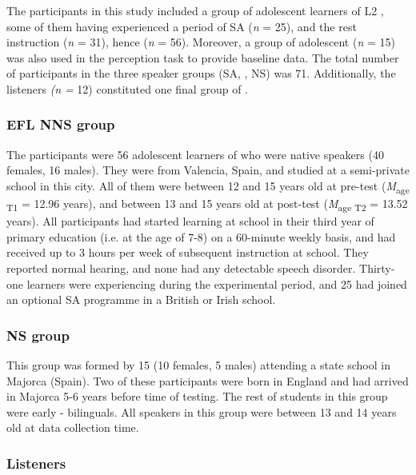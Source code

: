 \documentclass[output=paper]{langsci/langscibook}
\begin{document}
The participants in this study included a group of  adolescent learners of {L2} , some of them having experienced a period of SA (\textit{n} = 25), and the rest  instruction (\textit{n} = 31), hence  (\textit{n} = 56). Moreover, a group of adolescent   (\textit{n} = 15) was also used in the perception task to provide baseline data. The total number of participants in the three speaker groups (SA, , NS) was 71. Additionally, the listeners \textit{(n} \textit{=} 12) constituted one final group of .


\subsubsection{ EFL NNS group}

The  participants were 56 adolescent learners of  who were native  speakers (40 females, 16 males). They were from Valencia, Spain, and studied at a semi-private school in this city. All of them were between 12 and 15 years old at pre-test (\textit{M}\textsubscript{age T1} = 12.96 years), and between 13 and 15 years old at post-test (\textit{M}\textsubscript{age T2} = 13.52 years). All participants had started learning  at school in their third year of primary education (i.e. at the age of 7-8) on a 60-minute weekly basis, and had received up to 3 hours per week of subsequent  instruction at school. They reported normal hearing, and none had any detectable speech disorder. Thirty-one learners were experiencing  during the experimental period, and 25 had joined an optional SA programme in a British or Irish school.


\subsubsection{NS group}

This group was formed by 15   (10 females, 5 males) attending a state school in Majorca (Spain). Two of these participants were born in England and had arrived in Majorca 5-6 years before time of testing. The rest of students in this group were early - bilinguals. All speakers in this group were between 13 and 14 years old at data collection time.


\subsubsection{Listeners}
\end{document}
